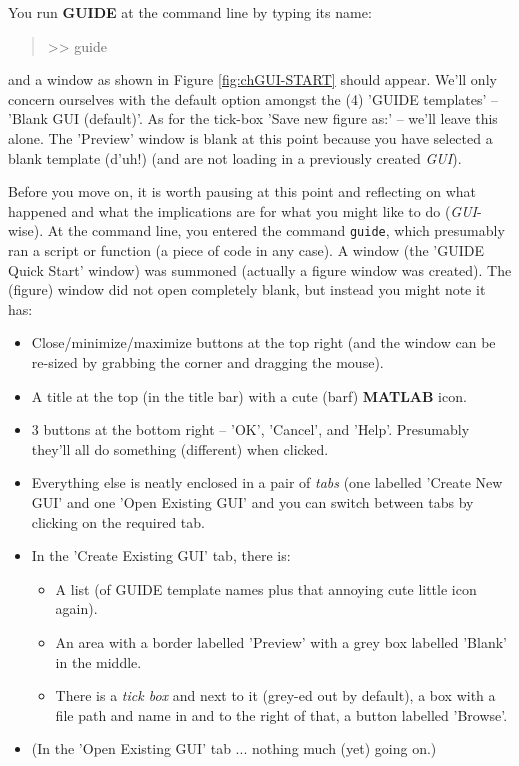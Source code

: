 \documentclass{tufte-book} %
\newenvironment{docspec}{\begin{quotation}\ttfamily\parskip0pt\parindent0pt\ignorespaces}{\end{quotation}}
\begin{document}
You run \textbf{GUIDE} at the command line by typing its name:
\begin{docspec}
>> guide
\end{docspec}
and a window as shown in Figure \ref{fig:chGUI-START} should appear. We'll only concern ourselves with the default option amongst the (4) '\textsf{GUIDE templates}' -- '\textsf{Blank GUI (default)}'. As for the tick-box '\textsf{Save new figure as:}' -- we'll leave this alone. The '\textsf{Preview}' window is blank at this point because you have selected a blank template (d'uh!) (and are not loading in a previously created \textit{GUI}). 

Before you move on, it is worth pausing at this point and reflecting on what happened and what the implications are for what you might like to do (\textit{GUI}-wise). At the command line, you entered the command \texttt{guide}, which presumably ran a script or function (a piece of code in any case). A window (the '\textsf{GUIDE Quick Start}' window) was summoned (actually a \textsf{figure window} was created). The (figure) window did not open completely blank, but instead you might note it has:
\begin{itemize}[noitemsep]
\setlength{\itemindent}{.2in}
\item Close/minimize/maximize buttons at the top right (and the window can be re-sized by grabbing the corner and dragging the mouse).
\item A title at the top (in the title bar) with a cute (barf) \textbf{MATLAB} icon.
\item  3 buttons at the bottom right -- '\textsf{OK}', '\textsf{Cancel}', and '\textsf{Help}'. Presumably they'll all do something (different) when clicked.
\item Everything else is neatly enclosed in a pair of \textit{tabs} (one labelled '\textsf{Create New GUI}' and one '\textsf{Open Existing GUI}' and you can switch between tabs by clicking on the required tab.
\item In the '\textsf{Create Existing GUI}' tab, there is:
\begin{itemize}[noitemsep]
\setlength{\itemindent}{.2in}
\item A list (of \textsf{GUIDE template} names plus that annoying cute little icon again).
\item An area with a border labelled '\textsf{Preview}' with a grey box labelled '\textsf{Blank}' in the middle.
\item There is a \textit{tick box} and next to it (grey-ed out by default), a box with a file path and name in and to the right of that, a button labelled '\textsf{Browse}'.
\end{itemize}
\item (In the '\textsf{Open Existing GUI}' tab ... nothing much (yet) going on.)
\end{itemize} 
\end{document}
